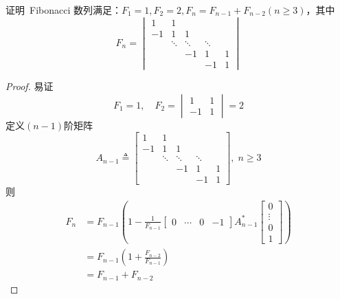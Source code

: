 \documentclass[twoside,openright]{book}
\begin{document}
\begin{CJK*}{UTF8}{}
\begin{quest}
\label{quest:105}
证明\ Fibonacci 数列满足：$F_1=1,F_2=2,F_n=F_{n-1}+F_{n-2}(n \ge 3)$，其中
\[
F_n=
\begin{vmatrix}
1               & 1               &                 &        &                   \\
-1              & 1               & 1               &        &                   \\
                & \ddots          & \ddots          & \ddots &                   \\
                &                 & -1              & 1      & 1                 \\
                &                 &                 & -1     & 1
\end{vmatrix}
\]
\end{quest}
\begin{proof}
易证
\[
F_1=1, \quad
F_2=\begin{vmatrix} 1 & 1 \\-1 & 1 \end{vmatrix}=2
\]
定义$(n-1)$阶矩阵
\[
A_{n-1} \triangleq \begin{bmatrix}
1               & 1               &                 &        &                   \\
-1              & 1               & 1               &        &                   \\
                & \ddots          & \ddots          & \ddots &                   \\
                &                 & -1              & 1      & 1                 \\
                &                 &                 & -1     & 1
\end{bmatrix},\; n \ge 3
\]
则
\begin{align*}
F_n&=F_{n-1}\left(1-\frac{1}{F_{n-1}}\begin{bmatrix} 0 & \cdots & 0 & -1 \end{bmatrix} A_{n-1}^* \begin{bmatrix}0 \\ \vdots \\ 0 \\ 1 \end{bmatrix}\right) \\
   &=F_{n-1}\left(1+\frac{F_{n-2}}{F_{n-1}}\right) \\
   &=F_{n-1}+F_{n-2}
\end{align*}
\end{proof}


\end{CJK*}
\end{document}
